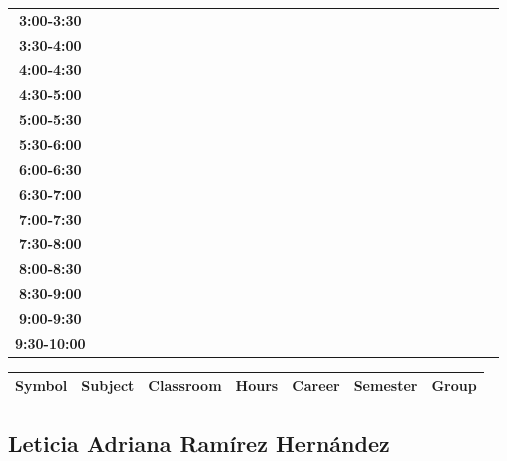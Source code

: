 \documentclass{article}
\begin{document}
\begin{table}[ht]
\begin{tabular}{|c|c|c|c|c|c|c|c|c|c|c|c|c|c|c|c|c|c|c|c|c|c|c|c|c|c|c|c|c|c|}
\textbf{3:00-3:30} &   &   &   &   &   &   &   \\
 \cline{1-8} 
\textbf{3:30-4:00} &   &   &   &   &   &   &   \\
 \cline{1-8} 
\textbf{4:00-4:30} &   &   &   &   &   &   &   \\
 \cline{1-8} 
\textbf{4:30-5:00} &   &   &   &   &   &   &   \\
 \cline{1-8} 
\textbf{5:00-5:30} &   &   &   &   &   &   &   \\
 \cline{1-8} 
\textbf{5:30-6:00} &   &   &   &   &   &   &   \\
 \cline{1-8} 
\textbf{6:00-6:30} &   &   &   &   &   &   &   \\
 \cline{1-8} 
\textbf{6:30-7:00} &   &   &   &   &   &   &   \\
 \cline{1-8} 
\textbf{7:00-7:30} &   &   &   &   &   &   &   \\
 \cline{1-8} 
\textbf{7:30-8:00} &   &   &   &   &   &   &   \\
 \cline{1-8} 
\textbf{8:00-8:30} &   &   &   &   &   &   &   \\
 \cline{1-8} 
\textbf{8:30-9:00} &   &   &   &   &   &   &   \\
 \cline{1-8} 
\textbf{9:00-9:30} &   &   &   &   &   &   &   \\
 \cline{1-8} 
\textbf{9:30-10:00} &   &   &   &   &   &   &   \\
 \cline{1-8} 
\end{tabular}\end{table}

        
        \begin{tabular}{|>{\centering\arraybackslash}m{2cm}|>{\centering\arraybackslash}m{4cm}|>{\centering\arraybackslash}m{2cm}|>{\centering\arraybackslash}m{2cm}|>{\centering\arraybackslash}m{2cm}|>{\centering\arraybackslash}m{2cm}|>{\centering\arraybackslash}m{2cm}|}
        \hline
        \textbf{Symbol} & \textbf{Subject} & \textbf{Classroom} & \textbf{Hours} & \textbf{Career} & \textbf{Semester} & \textbf{Group} \\
        \hline
        \end{tabular}
                    

        \newpage
        

        \subsection{Leticia Adriana Ram\'irez Hern\'andez}
        \vspace*{.1cm}
        
\end{document}
